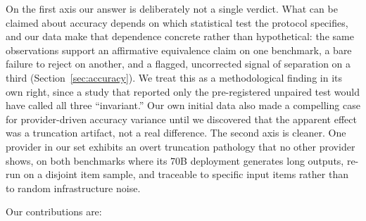 \documentclass[11pt]{article}
\begin{document}
On the first axis our answer is deliberately not a single verdict. What
can be claimed about accuracy depends on which statistical test the
protocol specifies, and our data make that dependence concrete rather
than hypothetical: the same observations support an affirmative
equivalence claim on one benchmark, a bare failure to reject on
another, and a flagged, uncorrected signal of separation on a third
(Section~\ref{sec:accuracy}). We treat this as a methodological
finding in its own right, since a study that reported only the
pre-registered unpaired test would have called all three ``invariant.''
Our own initial data also made a compelling case for provider-driven
accuracy variance until we discovered that the apparent effect was a
truncation artifact, not a real difference. The second axis is
cleaner. One provider in our set exhibits an overt truncation
pathology that no other provider shows, on both benchmarks where its
70B deployment generates long outputs, re-run on a disjoint item
sample, and traceable to specific input items rather than to random
infrastructure noise.

Our contributions are:
\end{document}
